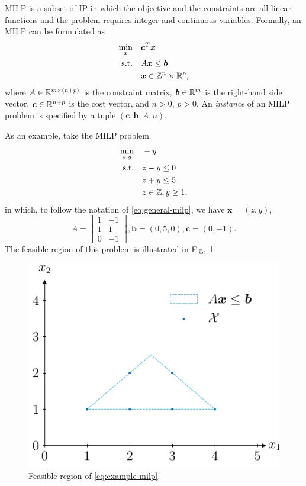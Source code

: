MILP is a subset of IP in which the objective and the constraints are all linear functions and the problem requires integer and continuous variables.
Formally, an MILP can be formulated as 
\begin{equation}\label{eq:general-milp}
\begin{split}
    \min_{\bm{x}} \quad & \bm{c}^{T}\bm{x} \\
    \textrm{s.t.} \quad & A\bm{x} \le \bm{b} \\
	  & \bm{x} \in \mathbb{Z}^{n}\times \mathbb{R}^{p}
,\end{split}
\end{equation}
where $A\in \mathbb{R}^{m\times (n+p)}$ is the constraint matrix, $\bm{b}\in \mathbb{R}^{m}$ is the right-hand side vector, $\bm{c}\in \mathbb{R}^{n+p}$ is the cost vector, and $n>0$, $p>0$.
An \emph{instance} of an MILP problem is specified by a tuple  $\left( \bm{c},\bm{b},A,n \right)$.

As an example, take the MILP problem
\begin{equation}\label{eq:example-milp}
\begin{split}
    \min_{z,y} \quad & -y \\
    \textrm{s.t.} \quad & z - y\le 0 \\
      & z+y \le 5 \\
      & z \in \mathbb{Z}, y\ge 1
,\end{split}
\end{equation}
in which, to follow the notation of \eqref{eq:general-milp}, we have $\bm{x}=(z,y)$, \[
A=\begin{bmatrix} 1 & -1 \\ 1 & 1 \\0 & -1 \end{bmatrix}, \bm{b} = (0, 5, 0), \bm{c} = (0, -1) 
.\]
The feasible region of this problem is illustrated in Fig.~\ref{fig:milp-example}.

\begin{figure}[h]
    \centering
    \includegraphics{pictures/milp_example_feasible_region.pdf}
    \caption{Feasible region of \eqref{eq:example-milp}.}
    \label{fig:milp-example}
\end{figure}


